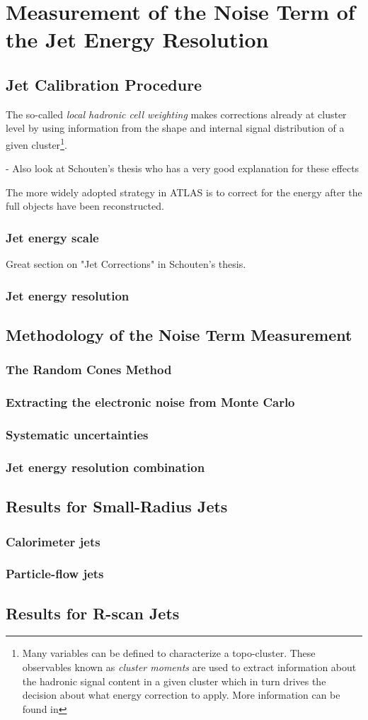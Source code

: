 \chapter{Measurement of the Noise Term of the Jet Energy Resolution}
\label{chap:calibration}

\section{Jet Calibration Procedure}
The so-called \emph{local hadronic cell weighting} makes corrections already at cluster level by using information from the shape and internal signal distribution of a given cluster\footnote{Many variables can be defined to characterize a topo-cluster. These observables known as \emph{cluster moments} are used to extract information about the hadronic signal content in a given cluster which in turn drives the decision about what energy correction to apply. More information can be found in }.

- Also look at Schouten's thesis who has a very good explanation for these effects

The more widely adopted strategy in ATLAS is to correct for the energy after the full objects have been reconstructed.




\subsection{Jet energy scale}
Great section on "Jet Corrections" in Schouten's thesis.

\subsection{Jet energy resolution}
\section{Methodology of the Noise Term Measurement}
\subsection{The Random Cones Method}
\subsection{Extracting the electronic noise from Monte Carlo}
\subsection{Systematic uncertainties}
\subsection{Jet energy resolution combination}
\section{Results for Small-Radius Jets}
\subsection{Calorimeter jets}
\subsection{Particle-flow jets}
\section{Results for R-scan Jets}
